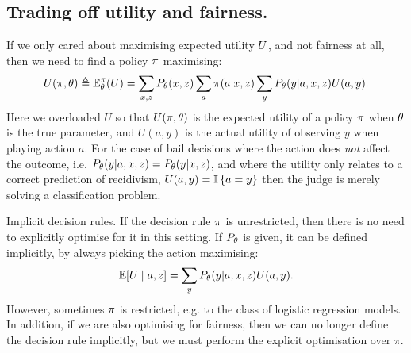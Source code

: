 \subsection{Trading off utility and fairness.}
\label{sec:trad-util-fairn}
  If we only cared about maximising expected utility $U$, and not fairness at all, then we need to find a policy $\pi$ maximising:
  \begin{equation} 
    \label{eq:expected-utility-judge}
    U(\pi, \theta) \mathrel{\triangleq} \mathop{\mbox{\ensuremath{\mathbb{E}}}}\nolimits_\theta^\pi(U) = \sum_{x,z} P_\theta(x, z) \sum_a \pi(a | x, z) \sum_y P_\theta(y | a, x, z) U(a,y).
  \end{equation}
  Here we overloaded $U$ so that $U(\pi, \theta)$ is the expected utility of a policy $\pi$ when $\theta$ is the true parameter, and $U(a,y)$ is the actual utility of observing $y$ when playing action $a$.   For the case of bail decisions where the action does \emph{not} affect the outcome, i.e. $P_\theta(y | a, x, z) =P_\theta(y | x, z)$, and where the utility only relates to a correct prediction of recidivism, $U(a,y) = \mathop{\mbox{\ensuremath{\mathbb{I}}}}\left\{a = y\right\}$ then the judge is merely solving a classification problem.
  
  \begin{theoryblock}{Implicit decision rules.}
    If the decision rule $\pi$ is unrestricted, then there is no
    need to explicitly optimise for it in this setting. If $P_\theta$ is given, it can be defined implicitly, by always picking the action maximising:
    \[
      \mathop{\mbox{\ensuremath{\mathbb{E}}}}\nolimits[U \mid a, z] = \sum_y P_\theta(y | a, x, z) U(a,y).
    \]
    However, sometimes $\pi$ is restricted, e.g. to the class of logistic regression models. In addition, if we are also optimising for fairness, then we can no longer define the decision rule implicitly, but we must perform the explicit optimisation over $\pi$.
  \end{theoryblock}

